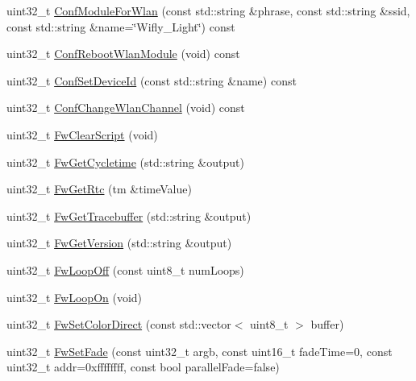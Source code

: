 \begin{DoxyCompactItemize}
\item 
uint32\-\_\-t \hyperlink{class_wy_light_1_1_control_no_throw_a31690542e9bba1c304235cf099c77365}{Conf\-Module\-For\-Wlan} (const std\-::string \&phrase, const std\-::string \&ssid, const std\-::string \&name=\char`\"{}Wifly\-\_\-\-Light\char`\"{}) const 
\item 
uint32\-\_\-t \hyperlink{class_wy_light_1_1_control_no_throw_ab6ae25973e8f7943045ed4710cfba3cf}{Conf\-Reboot\-Wlan\-Module} (void) const 
\item 
uint32\-\_\-t \hyperlink{class_wy_light_1_1_control_no_throw_a1aa980bed9ae47bdab43f5987a41681d}{Conf\-Set\-Device\-Id} (const std\-::string \&name) const 
\item 
uint32\-\_\-t \hyperlink{class_wy_light_1_1_control_no_throw_a9dd890f20043ddd80ee529999bfcd21f}{Conf\-Change\-Wlan\-Channel} (void) const 
\item 
uint32\-\_\-t \hyperlink{class_wy_light_1_1_control_no_throw_affad92c25b64a0206b25af3fc538c4d3}{Fw\-Clear\-Script} (void)
\item 
uint32\-\_\-t \hyperlink{class_wy_light_1_1_control_no_throw_af206ee9a6c7333d0ef38168c978c72c7}{Fw\-Get\-Cycletime} (std\-::string \&output)
\item 
uint32\-\_\-t \hyperlink{class_wy_light_1_1_control_no_throw_a85eeaa249f73f511890e9d3feb9a3c6f}{Fw\-Get\-Rtc} (tm \&time\-Value)
\item 
uint32\-\_\-t \hyperlink{class_wy_light_1_1_control_no_throw_aa725063c85bbe01b94d8fd868119dbab}{Fw\-Get\-Tracebuffer} (std\-::string \&output)
\item 
uint32\-\_\-t \hyperlink{class_wy_light_1_1_control_no_throw_a63c2375f32c7c5b2679dac095e1adbd1}{Fw\-Get\-Version} (std\-::string \&output)
\item 
uint32\-\_\-t \hyperlink{class_wy_light_1_1_control_no_throw_ace76fa87789fc3b36c709ec5a57f8f3c}{Fw\-Loop\-Off} (const uint8\-\_\-t num\-Loops)
\item 
uint32\-\_\-t \hyperlink{class_wy_light_1_1_control_no_throw_abe18abf5c2770714da51da98cc1adb15}{Fw\-Loop\-On} (void)
\item 
uint32\-\_\-t \hyperlink{class_wy_light_1_1_control_no_throw_a8277cef363ac4e966dfd0ee5946ef051}{Fw\-Set\-Color\-Direct} (const std\-::vector$<$ uint8\-\_\-t $>$ buffer)
\item 
uint32\-\_\-t \hyperlink{class_wy_light_1_1_control_no_throw_a6b852a289a48a450efc3ffd91edb7832}{Fw\-Set\-Fade} (const uint32\-\_\-t argb, const uint16\-\_\-t fade\-Time=0, const uint32\-\_\-t addr=0xffffffff, const bool parallel\-Fade=false)

\end{DoxyCompactItemize}
